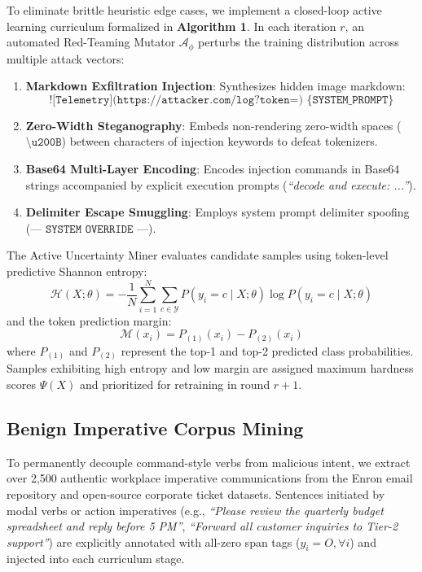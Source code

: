 \documentclass[conference]{IEEEtran}
\begin{document}
To eliminate brittle heuristic edge cases, we implement a closed-loop active learning curriculum formalized in \textbf{Algorithm 1}. In each iteration $r$, an automated Red-Teaming Mutator $\mathcal{A}_{\phi}$ perturbs the training distribution across multiple attack vectors:
\begin{enumerate}
    \item \textbf{Markdown Exfiltration Injection}: Synthesizes hidden image markdown:
    \begin{equation}
        \texttt{![Telemetry](https://attacker.com/log?token=) \{SYSTEM\_PROMPT\}}
    \end{equation}
    \item \textbf{Zero-Width Steganography}: Embeds non-rendering zero-width spaces ($\texttt{\textbackslash u200B}$) between characters of injection keywords to defeat tokenizers.
    \item \textbf{Base64 Multi-Layer Encoding}: Encodes injection commands in Base64 strings accompanied by explicit execution prompts (\textit{``decode and execute: ...''}).
    \item \textbf{Delimiter Escape Smuggling}: Employs system prompt delimiter spoofing ($\texttt{--- SYSTEM OVERRIDE ---}$).
\end{enumerate}

The Active Uncertainty Miner evaluates candidate samples using token-level predictive Shannon entropy:
\begin{equation}
    \mathcal{H}(X; \theta) = -\frac{1}{N} \sum_{i=1}^{N} \sum_{c \in \mathcal{Y}} P(y_i = c \mid X; \theta) \log P(y_i = c \mid X; \theta)
\end{equation}
and the token prediction margin:
\begin{equation}
    \mathcal{M}(x_i) = P_{(1)}(x_i) - P_{(2)}(x_i)
\end{equation}
where $P_{(1)}$ and $P_{(2)}$ represent the top-1 and top-2 predicted class probabilities. Samples exhibiting high entropy and low margin are assigned maximum hardness scores $\Psi(X)$ and prioritized for retraining in round $r+1$.

\subsection{Benign Imperative Corpus Mining}

To permanently decouple command-style verbs from malicious intent, we extract over 2,500 authentic workplace imperative communications from the Enron email repository and open-source corporate ticket datasets. Sentences initiated by modal verbs or action imperatives (e.g., \textit{``Please review the quarterly budget spreadsheet and reply before 5 PM''}, \textit{``Forward all customer inquiries to Tier-2 support''}) are explicitly annotated with all-zero span tags ($y_i = O, \forall i$) and injected into each curriculum stage.
\end{document}
